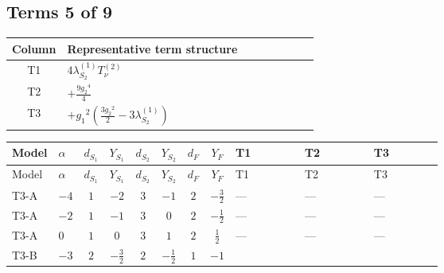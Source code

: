 \documentclass[8pt]{article}
\begin{document}
\begin{landscape}
\subsection*{Terms 5 of 9}
\begin{center}
\begin{tabular}{@{}c >{\raggedright\arraybackslash}p{0.82\linewidth}@{}}
\toprule
Column & Representative term structure \\
\midrule
T1 & \(\displaystyle 4 {\lambda_{S_2}^{(1)}} T_{\nu}^{(2)}\) \\
\midrule
T2 & \(\displaystyle +\frac{9 {g_2}^4}{4}\) \\
\midrule
T3 & \(\displaystyle +{g_1}^2 \left(\frac{3 {g_2}^2}{2}-3 {\lambda_{S_2}^{(1)}}\right)\) \\
\midrule
\bottomrule
\end{tabular}
\end{center}
\smallskip
\tiny
\begin{longtable}{@{}llcccccc >{\raggedright\arraybackslash}p{0.21\linewidth} >{\raggedright\arraybackslash}p{0.21\linewidth} >{\raggedright\arraybackslash}p{0.21\linewidth}@{}}
\toprule
Model & $\alpha$ & $d_{S_1}$ & $Y_{S_1}$ & $d_{S_2}$ & $Y_{S_2}$ & $d_F$ & $Y_F$ & T1 & T2 & T3 \\
\midrule
\endfirsthead
\toprule
Model & $\alpha$ & $d_{S_1}$ & $Y_{S_1}$ & $d_{S_2}$ & $Y_{S_2}$ & $d_F$ & $Y_F$ & T1 & T2 & T3 \\
\midrule
\endhead
T3-A & $-4$ & $1$ & $-2$ & $3$ & $-1$ & $2$ & $-\frac{3}{2}$ & --- & --- & --- \\
\midrule
T3-A & $-2$ & $1$ & $-1$ & $3$ & $0$ & $2$ & $-\frac{1}{2}$ & --- & --- & --- \\
\midrule
T3-A & $0$ & $1$ & $0$ & $3$ & $1$ & $2$ & $\frac{1}{2}$ & --- & --- & --- \\
\midrule
T3-B & $-3$ & $2$ & $-\frac{3}{2}$ & $2$ & $-\frac{1}{2}$ & $1$ & $-1$ & \scriptsize\adjustbox{max width=\linewidth}{$\begin{gathered} 4 {\lambda_{S_2}^{(1)}} T_{\nu}^{(2)}\end{gathered}$} & \scriptsize\adjustbox{max width=\linewidth}{$\begin{gathered} +\frac{9 {g_2}^4}{4}\end{gathered}$} & \scriptsize\adjustbox{max width=\linewidth}{$\begin{gathered} +{g_1}^2 \left(\frac{3 {g_2}^2}{2}-3 {\lambda_{S_2}^{(1)}}\right)\end{gathered}$} \\

\end{longtable}
\end{landscape}
\end{document}
